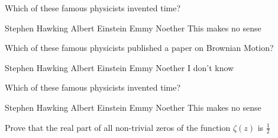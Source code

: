 \documentclass[addpoints,10pt]{exam}
\begin{document}
\begin{questions}
\begin{parts}
		\end{parts}
	    \droptotalpoints
	
	   \question Which of these famous physicists invented time?
	   
	   \begin{oneparchoices}
	   	\choice Stephen Hawking 
	   	\choice Albert Einstein
	   	\choice Emmy Noether
	   	\choice This makes no sense
	   \end{oneparchoices}
	   
	   \question Which of these famous physicists published a paper on Brownian Motion?
	   
	   \begin{checkboxes}
	   	\choice Stephen Hawking 
	   	\choice Albert Einstein
	   	\choice Emmy Noether
	   	\choice I don't know
	   \end{checkboxes}
	    
	    \question Which of these famous physicists invented time?
	    
	    \begin{choices}
	    	\choice Stephen Hawking 
	    	\choice Albert Einstein
	    	\choice Emmy Noether
	    	\choice This makes no sense
	    \end{choices}
        
       \bonusquestion[30] Prove that the real part of all non-trivial zeros of the function 
       \(\zeta(z)\) is \(\frac{1}{2}\)
    
	\end{questions}
   \combinedgradetable[h]
   
   \gradetable[v]

   \bonusgradetable
\end{document}
